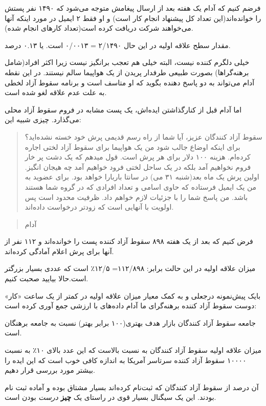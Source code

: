 فرضم کنیم که آدام یک هفته بعد از ارسال پیغامش متوجه می‌شود که ۱۴۹۰ نفر
پستش را خوانده‌اند(این تعداد کل پیشنهاد‌ انجام کار است) و او فقط ۲ ایمیل
در مورد اینکه آنها می‌خواهند شرکت دریافت کرده است(تعداد کارهای انجام
شده).

مقدار سطح علاقه اولیه در این حال ۲/۱۴۹۰ = ۰/۰۰۱۳ است. یا ۰.۱۳ درصد.

خیلی دلگرم کننده نیست، البته خیلی هم تعجب برانگیز نیست زیرا اکثر
افراد(شامل برهنه‌گراها) بصورت طبیعی طرفدار پریدن از یک هواپیما سالم
نیستند. در این نقطه آدام می‌تواند به دو پاسخ دهنده بگوید که او متاسف است
و برنامه سقوط آزاد لخطی به علت عدم علاقه لغو شده است.

اما آدام قبل از کنارگذاشتن ایده‌اش، یک پست مشابه در فروم سقوط آزاد محلی
می‌گذارد. چیزی شبیه این:

\begin{quote}
سقوط آزاد کنندگان عزیز، آیا شما از راه رسم قدیمی پرش خود خسته نشده‌اید؟
برای اینکه اوضاع جالب شود من یک هواپیما برای سقوط آزاد لختی اجاره
کرده‌ام. هزینه ۱۰۰ دلار برای هر پرش است. قول میدهم که یک دشت پر خار فروم
نخواهیم آمد بلکه در یک ساحل لختی فرود خواهیم آمد چه هیجان انگیز. اولین
پرش یک ماه بعد(شنبه ۳۱ می) در سانتا باربارا خواهد بود. برای عضوید به من
یک ایمیل فرستاده که حاوی اسامی و تعداد افرادی که در گروه شما هستند باشد.
من پاسخ شما را با جزئیات لازم خواهم داد. ظرفیت محدود است پس اولویت با
آنهایی است که زودتر درخواست داده‌اند.
\end{quote}

\begin{quote}
آدام
\end{quote}

فرض کنیم که بعد از یک هفته ۸۹۸ سقوط آزاد کننده پست را خوانده‌اند و ۱۱۲
نفر از آنها برای پرش اعلام آمادگی کرده‌اند.

میزان علاقه اولیه در این حالت برابر: ۱۱۲/۸۹۸= ۱۲/۵٪ است که عددی بسیار
بزرگتر است.حالا بیایید صحبت کنیم.

بایک پیش‌نمونه درجعلی و به کمک معیار میزان علاقه اولیه در کمتر از یک
ساعت «کار» دوست سقوط آزاد کننده برهنه‌گرای ما آدام داده‌های با ارزشی جمع
آوری کرده است:

جامعه سقوط آزاد کنندگان بازار هدف بهتری(۱۰۰ برابر بهتر) نسبت به جامعه
برهنگان است.

میزان علاقه اولیه سقوط آزاد کنندگان به نسبت بالاست که این عدد بالای ۱۰٪
به نسبت ۱۰۰۰۰ سقوط آزاد کننده سرتاسر آمریکا به اندازه کافی خوب است که
این ایده را بیشتر مورد بررسی قرار دهیم.

آن درصد از سقوط آزاد کنندگان که ثبت‌نام کرده‌اند بسیار مشتاق بوده و
آماده ثبت نام بودند. این یک سیگنال بسیار قوی در راستای یک \textbf{چیز}
\emph{درست} بودن است.


